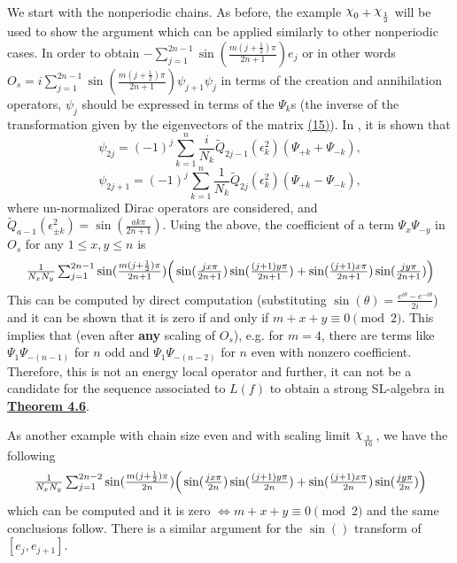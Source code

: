 \documentclass[twoside,11pt,titlepage]{amsart}
\renewcommand{\=}[1]{\stackrel{#1}{=}} %
\theoremstyle{definition}
\theoremstyle{remark}
\DeclareRobustCommand{\rchi}{{\mathpalette\irchi\relax}}
\newcommand{\irchi}[2]{\raisebox{\depth}{$#1\chi$}}
\begin{document}
We start with the nonperiodic chains. As before, the example $\rchi_0+\rchi_{\frac{1}{2}}$ will be used to show the argument which can be applied similarly to other nonperiodic cases. In order to obtain $-\sum_{j=1}^{2n-1} \sin(\frac{m(j+\frac{1}{2})\pi}{2n+1})e_j$  or in other words $O_s=i\sum_{j=1}^{2n-1} \sin(\frac{m(j+\frac{1}{2})\pi}{2n+1})\psi_{j+1}\psi_j$ in terms of the creation and annihilation operators, $\psi_j$ should be expressed in terms of the $\Psi_k$s (the inverse of the transformation given by the eigenvectors of the matrix \hyperref[eq15]{(15)}). In \cite[(24)]{fendley2014free}, it is shown that
$$\psi_{2j}=(-1)^j\sum_{k=1}^n \frac{i}{N_k} \widetilde{Q}_{2j-1}(\epsilon_k^2)(\Psi_{+k}+\Psi_{-k}),$$$$\psi_{2j+1}=(-1)^j\sum_{k=1}^n \frac{1}{N_k} \widetilde{Q}_{2j}(\epsilon_k^2)(\Psi_{+k}-\Psi_{-k}),$$
where un-normalized Dirac operators are considered, and $\widetilde{Q}_{a-1}(\epsilon_{\pm k}^2)=\sin(\frac{ak\pi}{2n+1})$. Using the above, the coefficient of a term $\Psi_x\Psi_{-y}$ in $O_s$ for any $1 \le x,y\le n$ is
\begin{gather*}
\scalebox{0.999}{$\frac{1}{N_xN_y}\sum_{j=1}^{2n-1} \sin(\frac{m(j+\frac{1}{2})\pi}{2n+1})\Big( \sin(\frac{jx\pi}{2n+1})\sin(\frac{(j+1)y\pi}{2n+1})+\sin(\frac{(j+1)x\pi}{2n+1})\sin(\frac{jy\pi}{2n+1})\Big )$}
\end{gather*}
This can be computed by direct computation (substituting $\sin(\theta)=\frac{e^{i\theta}-e^{-i\theta}}{2i}$) and it can be shown that it is zero if and only if $m+x+y \equiv 0 \pmod{2}$. This implies that (even after \textbf{any} scaling of $O_s$), e.g. for $m=4$, there are terms like $\Psi_{1}\Psi_{-(n-1)}$ for $n$ odd and $\Psi_{1}\Psi_{-(n-2)}$ for $n$ even with nonzero coefficient. Therefore, this is not an energy local operator and further, it can not be a candidate for the sequence associated to $L(f)$ to obtain a strong SL-algebra in \hyperref[thm4.6]{\textbf{Theorem 4.6}}. 

As another example with chain size even and with scaling limit $\rchi_{\frac{1}{16}}$, we have the following
\begin{gather*}
\scalebox{0.999}{$\frac{1}{N_xN_y}\sum_{j=1}^{2n-2} \sin(\frac{m(j+\frac{1}{2})\pi}{2n})\Big( \sin(\frac{jx\pi}{2n})\sin(\frac{(j+1)y\pi}{2n})+\sin(\frac{(j+1)x\pi}{2n})\sin(\frac{jy\pi}{2n})\Big )$}
\end{gather*}
which can be computed and it is zero $\Leftrightarrow m+x+y \equiv 0 \pmod{2}$ and the same conclusions follow. There is a similar argument for the $\sin()$ transform of $[e_j,e_{j+1}]$.
\end{document}
